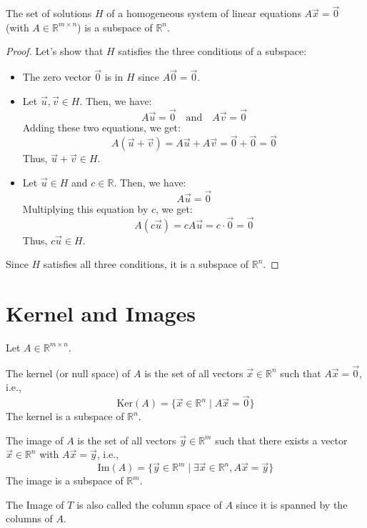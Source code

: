 \begin{theorem}
    The set of solutions $H$ of a homogeneous system of linear equations $A\vec{x} = \vec{0}$ (with $A \in \mathbb{R}^{m \times n}$) is a subspace of $\mathbb{R}^n$.
\end{theorem}
\begin{proof}
    Let's show that $H$ satisfies the three conditions of a subspace:
    \begin{itemize}[itemsep=1pt,label=$\circ$]
        \item The zero vector $\vec{0}$ is in $H$ since $A\vec{0} = \vec{0}$.
        \item Let $\vec{u}, \vec{v} \in H$. Then, we have:
        \[ A\vec{u} = \vec{0} \quad \text{and} \quad A\vec{v} = \vec{0} \]
        Adding these two equations, we get:
        \[ A(\vec{u} + \vec{v}) = A\vec{u} + A\vec{v} = \vec{0} + \vec{0} = \vec{0} \]
        Thus, $\vec{u} + \vec{v} \in H$.
        \item Let $\vec{u} \in H$ and $c \in \mathbb{R}$. Then, we have:
        \[ A\vec{u} = \vec{0} \]
        Multiplying this equation by $c$, we get:
        \[ A(c\vec{u}) = cA\vec{u} = c\cdot\vec{0} = \vec{0} \]
        Thus, $c\vec{u} \in H$.
    \end{itemize}
    Since $H$ satisfies all three conditions, it is a subspace of $\mathbb{R}^n$.
\end{proof}

\section{Kernel and Images}
Let $A \in \mathbb{R}^{m \times n}$.
\begin{definition}[Kernel]
    The kernel (or null space) of $A$ is the set of all vectors $\vec{x} \in \mathbb{R}^n$ such that $A\vec{x} = \vec{0}$, i.e.,
    \[ \text{Ker}(A) = \{ \vec{x} \in \mathbb{R}^n \mid A\vec{x} = \vec{0} \} \]
    The kernel is a subspace of $\mathbb{R}^n$.
\end{definition}

\begin{definition}[Image]
    The image of $A$ is the set of all vectors $\vec{y} \in \mathbb{R}^m$ such that there exists a vector $\vec{x} \in \mathbb{R}^n$ with $A\vec{x} = \vec{y}$, i.e.,
    \[ \text{Im}(A) = \{ \vec{y} \in \mathbb{R}^m \mid \exists \vec{x} \in \mathbb{R}^n, A\vec{x} = \vec{y} \} \]
    The image is a subspace of $\mathbb{R}^m$.
\end{definition}
The Image of $T$ is also called the column space of $A$ since it is spanned by the columns of $A$.

